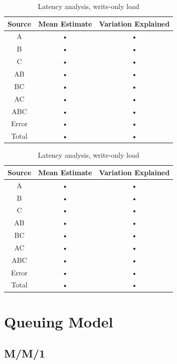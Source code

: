 \documentclass[11pt,a4paper]{article}
\begin{document}
\begin{table}
\begin{minipage}{.5\textwidth}
\centering
	\begin{tabular}{|c|c|c|}
	\hline 
	{\small Source} & {\small Mean Estimate} & {\small Variation Explained} \\ 
	\hline 
	A & • & • \\ 
	\hline 
	B & • & • \\ 
	\hline 
	C & • & • \\ 
	\hline 
	AB & • & • \\ 
	\hline 
	BC & • & • \\ 
	\hline 
	AC & • & • \\ 
	\hline 
	ABC & • & • \\ 
	\hline 
	Error & • & • \\ 
	\hline 
	Total & • & • \\ 
	\hline 
	\end{tabular} \caption{Throughput analysis, write-only load} \label{tab:2k-tpt-wo}
\end{minipage}%
\begin{minipage}{.5\textwidth}
\centering
	\begin{tabular}{|c|c|c|}
	\hline 
	{\small Source} & {\small Mean Estimate} & {\small Variation Explained} \\ 
	\hline 
	A & • & • \\ 
	\hline 
	B & • & • \\ 
	\hline 
	C & • & • \\ 
	\hline 
	AB & • & • \\ 
	\hline 
	BC & • & • \\ 
	\hline 
	AC & • & • \\ 
	\hline 
	ABC & • & • \\ 
	\hline 
	Error & • & • \\ 
	\hline 
	Total & • & • \\ 
	\hline 
	\end{tabular} \caption{Latency analysis, write-only load} \label{tab:2k-lat-wo}
\end{minipage}
\end{table}\label{tab:2k-wo}

\section{Queuing Model} \label{sec:queueing-model}

\subsection{M/M/1} \label{sec:mm1}
\end{document}
